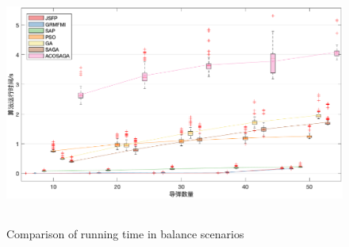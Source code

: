 \begin{figure}[!htp]
  \centering
  \includegraphics[height=8cm]{potential_game/BalanceBoxTime}
    {Comparison of running time in balance scenarios}
  \label{fig:balance_time}
\end{figure}



